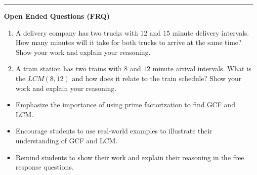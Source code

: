 \documentclass[10pt]{article}
\begin{document}
\vspace{-0.2cm}
\hrule
\vspace{0.2cm}
\textbf{\small Open Ended Questions (FRQ)}
\begin{enumerate}[label=\textbf{Q\arabic*.}, start=9, itemsep=5pt, topsep=0pt]

  \item \small A delivery company has two trucks with $12$ and $15$ minute delivery intervals. How many minutes will it take for both trucks to arrive at the same time? Show your work and explain your reasoning. \vspace{2cm}

  \item \small A train station has two trains with $8$ and $12$ minute arrival intervals. What is the $LCM(8, 12)$ and how does it relate to the train schedule? Show your work and explain your reasoning. \vspace{2cm}

\end{enumerate}

\vfill

\begin{tcolorbox}[colback=blue!5, colframe=mainblue!50, title=\small \textbf{Chef's Tips}, fonttitle=\bfseries, bottom=1mm]
\begin{itemize}[noitemsep, topsep=2pt, leftmargin=0.5cm]
  \item \scriptsize Emphasize the importance of using prime factorization to find GCF and LCM.\item \scriptsize Encourage students to use real-world examples to illustrate their understanding of GCF and LCM.\item \scriptsize Remind students to show their work and explain their reasoning in the free response questions.
\end{itemize}
\end{tcolorbox}
\end{document}

